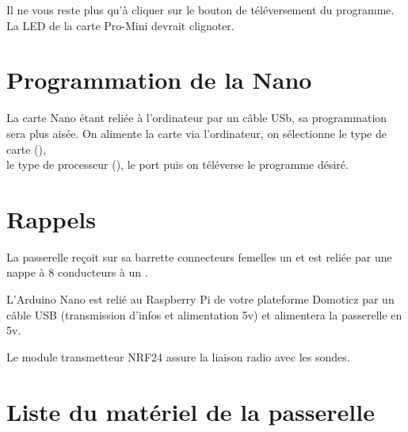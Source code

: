   Il ne vous reste plus qu'à cliquer sur le bouton de téléversement du programme.\\
  La LED de la carte Pro-Mini devrait clignoter.



 

  \section{Programmation de la Nano}

  La carte Nano étant reliée à l'ordinateur par un câble USb, sa programmation sera plus aisée. 
  On alimente la carte via l'ordinateur, on sélectionne le type de carte (),\\
   le type de processeur (), le port puis on téléverse le programme désiré.\\




\section{Rappels}

La passerelle reçoit sur sa barrette connecteurs femelles un  et est reliée par une nappe à 8 conducteurs à un .

L'Arduino Nano est relié au Raspberry Pi de votre plateforme Domoticz par un câble USB (transmission d'infos et alimentation 5v) et alimentera la passerelle en 5v.

Le module transmetteur NRF24 assure la liaison radio avec les sondes. 

\section{Liste du matériel de la passerelle}

